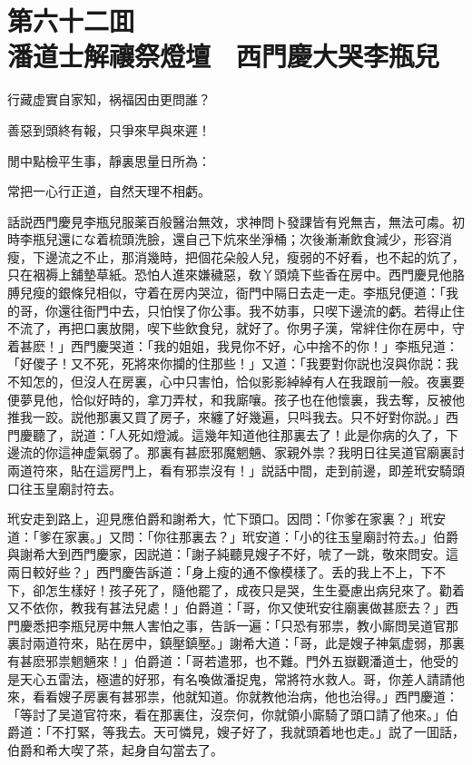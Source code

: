 
\chapter*{第六十二囬　\\潘道士解禳祭燈壇　西門慶大哭李瓶兒}


\begin{myquote}
行藏虚實自家知，祸福因由更問誰？

善惡到頭終有報，只爭來早與來遲！

閒中點檢平生事，靜裏思量日所為：

常把一心行正道，自然天理不相虧。
\end{myquote}

話説西門慶見李瓶兒服薬百般醫治無效，求神問卜發課皆有兇無吉，無法可䖏。初時李瓶兒還にな着梳頭洗臉，還自己下炕來坐淨桶；次後漸漸飲食減少，形容消瘦，下邊流之不止，那消幾時，把個花朵般人兒，瘦弱的不好看，也不起的炕了，只在裀褥上舖墊草紙。恐怕人進來嫌穢惡，敎丫頭燒下些香在房中。西門慶見他胳膊兒瘦的銀條兒相似，守着在房内哭泣，衙門中隔日去走一走。李瓶兒便道：「我的哥，你還往衙門中去，只怕悮了你公事。我不妨事，只喫下邊流的虧。若得止住不流了，再把口裏放開，喫下些飲食兒，就好了。你男子漢，常絆住你在房中，守着甚麽！」西門慶哭道：「我的姐姐，我見你不好，心中捨不的你！」李瓶兒道：「好儍子！又不死，死將來你攔的住那些！」又道：「我要對你説也沒與你説：我不知怎的，但沒人在房裏，心中只害怕，恰似影影綽綽有人在我跟前一般。夜裏要便夢見他，恰似好時的，拿刀弄杖，和我廝嚷。孩子也在他懷裏，我去奪，反被他推我一跤。説他那裏又買了房子，來纏了好幾遍，只呌我去。只不好對你説。」西門慶聽了，説道：「人死如燈滅。這幾年知道他往那裏去了！此是你病的久了，下邊流的你這神虚氣弱了。那裏有甚麽邪魔魍魎、家親外祟？我明日往吴道官廟裏討兩道符來，貼在這房門上，看有邪祟沒有！」説話中間，走到前邊，即差玳安騎頭口往玉皇廟討符去。

玳安走到路上，迎見應伯爵和謝希大，忙下頭口。因問：「你爹在家裏？」玳安道：「爹在家裏。」又問：「你往那裏去？」玳安道：「小的往玉皇廟討符去。」伯爵與謝希大到西門慶家，因説道：「謝子純聽見嫂子不好，唬了一跳，敬來問安。這兩日較好些？」西門慶告訴道：「身上瘦的通不像模樣了。丢的我上不上，下不下，卻怎生樣好！孩子死了，隨他罷了，成夜只是哭，生生憂慮出病兒來了。勸着又不依你，教我有甚法兒處！」伯爵道：「哥，你又使玳安往廟裏做甚麽去？」西門慶悉把李瓶兒房中無人害怕之事，告訴一遍：「只恐有邪祟，教小廝問吴道官那裏討兩道符來，貼在房中，鎮壓鎮壓。」謝希大道：「哥，此是嫂子神氣虚弱，那裏有甚麽邪祟魍魎來！」伯爵道：「哥若遣邪，也不難。門外五嶽觀潘道士，他受的是天心五雷法，極遣的好邪，有名喚做潘捉鬼，常將符水救人。哥，你差人請請他來，看看嫂子房裏有甚邪祟，他就知道。你就教他治病，他也治得。」西門慶道：「等討了吴道官符來，看在那裏住，沒奈何，你就領小廝騎了頭口請了他來。」伯爵道：「不打緊，等我去。天可憐見，嫂子好了，我就頭着地也走。」説了一囬話，伯爵和希大喫了茶，起身自勾當去了。

